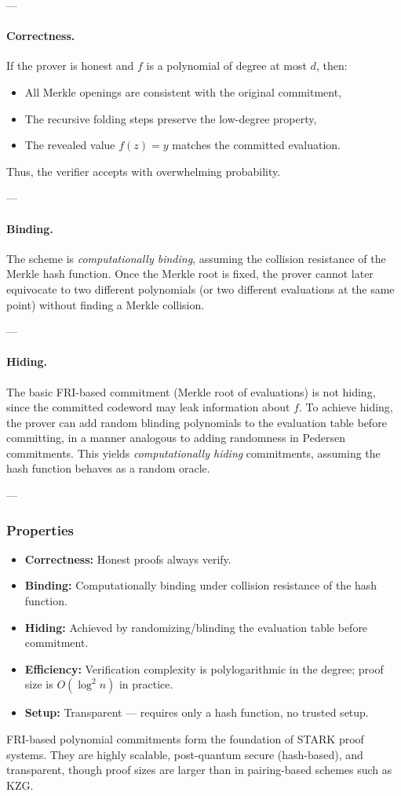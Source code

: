 ---

\paragraph{Correctness.}

If the prover is honest and $f$ is a polynomial of degree at most $d$, then:
\begin{itemize}
  \item All Merkle openings are consistent with the original commitment,  
  \item The recursive folding steps preserve the low-degree property,  
  \item The revealed value $f(z) = y$ matches the committed evaluation.  
\end{itemize}
Thus, the verifier accepts with overwhelming probability.

---

\paragraph{Binding.}

The scheme is \emph{computationally binding}, assuming the collision resistance of the Merkle hash function.  
Once the Merkle root is fixed, the prover cannot later equivocate to two different polynomials (or two different evaluations at the same point) without finding a Merkle collision.  

---

\paragraph{Hiding.}

The basic FRI-based commitment (Merkle root of evaluations) is not hiding, since the committed codeword may leak information about $f$.  
To achieve hiding, the prover can add random blinding polynomials to the evaluation table before committing, in a manner analogous to adding randomness in Pedersen commitments.  
This yields \emph{computationally hiding} commitments, assuming the hash function behaves as a random oracle.  

---

\subsubsection*{Properties}

\begin{itemize}
  \item \textbf{Correctness:} Honest proofs always verify.  
  \item \textbf{Binding:} Computationally binding under collision resistance of the hash function.  
  \item \textbf{Hiding:} Achieved by randomizing/blinding the evaluation table before commitment.  
  \item \textbf{Efficiency:} Verification complexity is polylogarithmic in the degree; proof size is $O(\log^2 n)$ in practice.  
  \item \textbf{Setup:} Transparent — requires only a hash function, no trusted setup.  
\end{itemize}

\begin{remark}
FRI-based polynomial commitments form the foundation of STARK proof systems.  
They are highly scalable, post-quantum secure (hash-based), and transparent, though proof sizes are larger than in pairing-based schemes such as KZG.
\end{remark}
